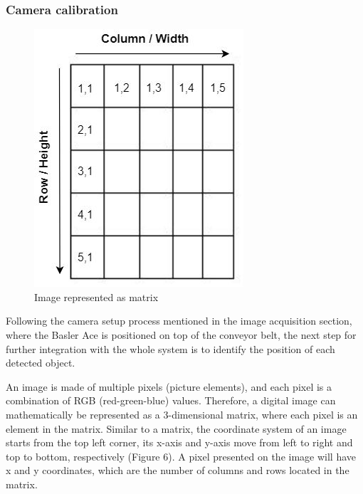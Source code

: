 \documentclass[10pt, letterpaper]{article}
\begin{document}
\subsubsection*{Camera calibration}
    \begin{figure}
        \includegraphics[width=\linewidth]{fig6.JPG} 
        \caption{Image represented as matrix}
        \label{fig6:wrapfig}
    \end{figure}    
    Following the camera setup process mentioned in the image acquisition section, where the Basler Ace is positioned on top of the conveyor belt, the next step for further integration with the whole system is to identify the position of each detected object.\par
    An image is made of multiple pixels (picture elements), and each pixel is a combination of RGB (red-green-blue) values. Therefore, a digital image can mathematically be represented as a 3-dimensional matrix, where each pixel is an element in the matrix. Similar to a matrix, the coordinate system of an image starts from the top left corner, its x-axis and y-axis move from left to right and top to bottom, respectively (Figure 6). A pixel presented on the image will have x and y coordinates, which are the number of columns and rows located in the matrix.\par
\end{document}
